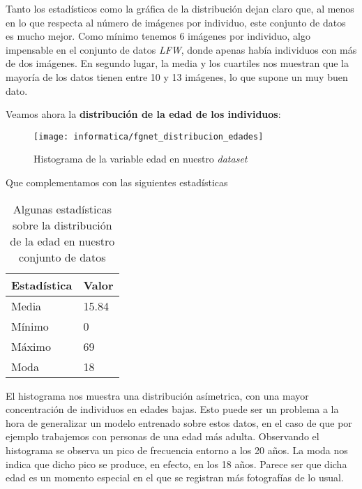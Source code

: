 Tanto los estadísticos como la gráfica de la distribución dejan claro que, al menos en lo que respecta al número de imágenes por individuo, este conjunto de datos es mucho mejor. Como mínimo tenemos 6 imágenes por individuo, algo impensable en el conjunto de datos \textit{LFW}, donde apenas había individuos con más de dos imágenes. En segundo lugar, la media y los cuartiles nos muestran que la mayoría de los datos tienen entre 10 y 13 imágenes, lo que supone un muy buen dato.

Veamos ahora la \textbf{distribución de la edad de los individuos}:

\begin{figure}[H]
    \centering
    \texttt{[image: informatica/fgnet\_distribucion\_edades]}
    \caption{Histograma de la variable edad en nuestro \textit{dataset}}
    \label{img:fgnet_histograma_edad}
\end{figure}

Que complementamos con las siguientes estadísticas

\begin{table}[H]
\centering
\begin{tabular}{|l|l|}
    \hline
    \textbf{Estadística} & \textbf{Valor} \\
    \hline

    Media  & 15.84 \\
    Mínimo & 0 \\
    Máximo & 69 \\
    Moda   & 18 \\

    \hline

\end{tabular}

    \caption{Algunas estadísticas sobre la distribución de la edad en nuestro conjunto de datos}
    \label{table:fgnet_estadisticas_edad}
\end{table}

El histograma  nos muestra una distribución asímetrica, con una mayor concentración de individuos en edades bajas. Esto puede ser un problema a la hora de generalizar un modelo entrenado sobre estos datos, en el caso de que por ejemplo trabajemos con personas de una edad más adulta. Observando el histograma se observa un pico de frecuencia entorno a los 20 años. La moda nos indica que dicho pico se produce, en efecto, en los 18 años. Parece ser que dicha edad es un momento especial en el que se registran más fotografías de lo usual.

